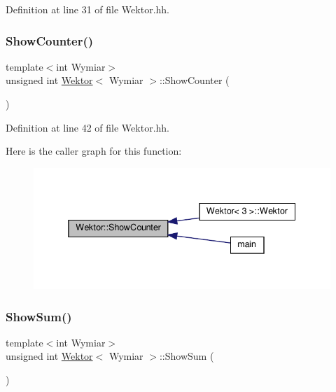 Definition at line 31 of file Wektor.\+hh.

\mbox{\label{class_wektor_a438c6da633a43e609467e22b6e2079db}} 
\subsubsection{\texorpdfstring{Show\+Counter()}{ShowCounter()}}
{\footnotesize\ttfamily template$<$int Wymiar$>$ \\
unsigned int \hyperlink{class_wektor}{Wektor}$<$ Wymiar $>$\+::Show\+Counter (\begin{DoxyParamCaption}{ }\end{DoxyParamCaption})\hspace{0.3cm}{\ttfamily [static]}}



Definition at line 42 of file Wektor.\+hh.

Here is the caller graph for this function\+:
\nopagebreak
\begin{figure}[H]
\begin{center}
\leavevmode
\includegraphics[width=338pt]{class_wektor_a438c6da633a43e609467e22b6e2079db_icgraph}
\end{center}
\end{figure}
\mbox{\label{class_wektor_a5365d8d93dfaa304c7fbd998e92660b7}} 
\subsubsection{\texorpdfstring{Show\+Sum()}{ShowSum()}}
{\footnotesize\ttfamily template$<$int Wymiar$>$ \\
unsigned int \hyperlink{class_wektor}{Wektor}$<$ Wymiar $>$\+::Show\+Sum (\begin{DoxyParamCaption}{ }\end{DoxyParamCaption})\hspace{0.3cm}{\ttfamily [static]}}



